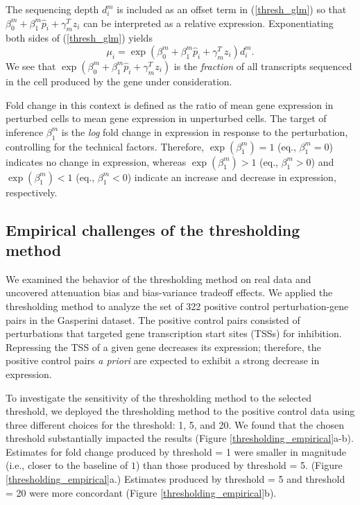 \documentclass[12pt]{article}
\begin{document}
The sequencing depth $d^m_i$ is included as an offset term in (\ref{thresh_glm}) so that $\beta^m_0 + \beta^m_1 \hat{p}_i + \gamma^T_m z_i$ can be interpreted as a relative expression. Exponentiating both sides of (\ref{thresh_glm}) yields
$$\mu_i = \exp \left( \beta^m_0 + \beta^m_1 \hat{p}_i + \gamma^T_m z_i \right) d_i^m.$$ We see that $\exp \left( \beta^m_0 + \beta^m_1 \hat{p}_i + \gamma^T_m z_i \right)$ is the \textit{fraction} of all transcripts sequenced in the cell produced by the gene under consideration.

Fold change in this context is defined as the ratio of mean gene expression in perturbed cells to mean gene expression in unperturbed cells. The target of inference $\beta^m_1$ is the \textit{log} fold change in expression in response to the perturbation, controlling for the technical factors. Therefore, $\exp(\beta^m_1) = 1$ (eq., $\beta^m_1 = 0$) indicates no change in expression, whereas $\exp(\beta^m_1) > 1$ (eq., $\beta^m_1 > 0$) and $\exp(\beta^m_1) < 1$ (eq., $\beta^m_1 < 0$) indicate an increase and decrease in expression, respectively.

\subsection{Empirical challenges of the thresholding method}\label{sec:thresholding_empirical}

We examined the behavior of the thresholding method on real data and uncovered attenuation bias and bias-variance tradeoff effects. We applied the thresholding method to analyze the set of 322 positive control perturbation-gene pairs in the Gasperini dataset. The positive control pairs consisted of perturbations that targeted gene transcription start sites (TSSs) for inhibition. Repressing the TSS of a given gene decreases its expression; therefore, the positive control pairs \textit{a priori} are expected to exhibit a strong decrease in expression.

To investigate the sensitivity of the thresholding method to the selected threshold, we deployed the thresholding method to the positive control data using three different choices for the threshold: 1, 5, and 20. We found that the chosen threshold substantially impacted the results (Figure \ref{thresholding_empirical}a-b). Estimates for fold change produced by threshold = 1 were smaller in magnitude (i.e., closer to the baseline of $1$) than those produced by threshold = 5. (Figure \ref{thresholding_empirical}a.) Estimates produced by threshold = 5 and threshold = 20 were more concordant (Figure \ref{thresholding_empirical}b). 
\end{document}
